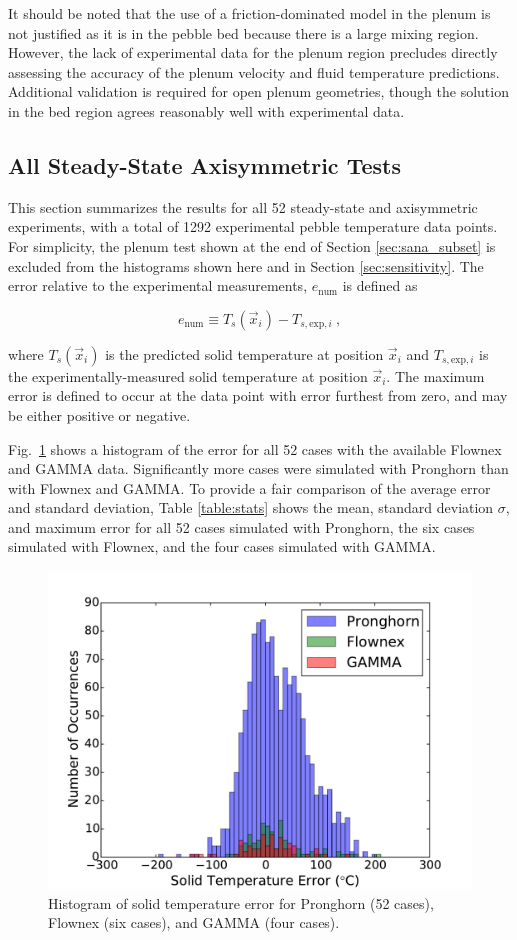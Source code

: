 It should be noted that the use of a friction-dominated model in the plenum is not justified as it is in the pebble bed because there is a large mixing region. However, the lack of experimental data for the plenum region precludes directly assessing the accuracy of the plenum velocity and fluid temperature predictions. Additional validation is required for open plenum geometries, though the solution in the bed region agrees reasonably well with experimental data.

\subsection{All Steady-State Axisymmetric Tests}
\label{sec:AllTests}

This section summarizes the results for all 52 steady-state and axisymmetric experiments, with a total of 1292 experimental pebble temperature data points. For simplicity, the plenum test shown at the end of Section \ref{sec:sana_subset} is excluded from the histograms shown here and in Section \ref{sec:sensitivity}. The error relative to the experimental measurements, \(e_\text{num}\) is defined as

\begin{equation}
\label{eq:Error}
e_\text{num}\equiv T_{s}\left(\vec{x}_i\right)-T_{s,\text{exp},i}\ ,
\end{equation}

\noindent where \(T_s\left(\vec{x}_i\right)\) is the predicted solid temperature at position \(\vec{x}_i\) and \(T_{s,\text{exp},i}\) is the experimentally-measured solid temperature at position \(\vec{x}_i\). The maximum error is defined to occur at the data point with error furthest from zero, and may be either positive or negative. 

Fig.\ \ref{fig:histogram} shows a histogram of the error for all 52 cases with the available Flownex and GAMMA data. Significantly more cases were simulated with Pronghorn than with Flownex and GAMMA. To provide a fair comparison of the average error and standard deviation, Table \ref{table:stats} shows the mean, standard deviation \(\sigma\), and maximum error for all 52 cases simulated with Pronghorn, the six cases simulated with Flownex, and the four cases simulated with GAMMA. 

\begin{figure}[h!]
\centering
\includegraphics[width=0.6\linewidth]{figs/histogram_abs_error.pdf}
\caption{Histogram of solid temperature error for Pronghorn (52 cases), Flownex (six cases), and GAMMA (four cases).}
\label{fig:histogram}
\end{figure}

